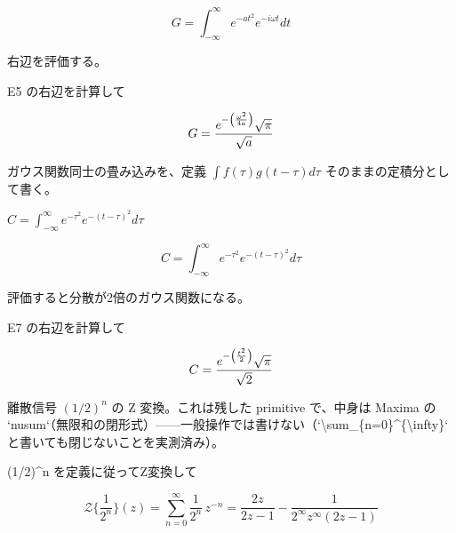 \documentclass[dvipdfmx,a4paper,11pt]{jsarticle}
\begin{document}
\begin{equation}
  G = \int_{-\infty}^{\infty} e^{-a t^2} e^{-i \omega t} dt
  \label{eq:E5}
\end{equation}

右辺を評価する。

E5 の右辺を計算して

\begin{equation}
  G = {{e^ {- \left(\frac{\omega^2}{4 a}\right) } \sqrt{\pi}}\over{\sqrt{a}}}
  \label{eq:E6}
\end{equation}

ガウス関数同士の畳み込みを、定義 $\int f(\tau)g(t-\tau)d\tau$ そのままの定積分として書く。

$C = \int_{-\infty}^{\infty} e^{-\tau^2} e^{-(t-\tau)^2} d\tau$

\begin{equation}
  C = \int_{-\infty}^{\infty} e^{-\tau^2} e^{-(t-\tau)^2} d\tau
  \label{eq:E7}
\end{equation}

評価すると分散が2倍のガウス関数になる。

E7 の右辺を計算して

\begin{equation}
  C = {{e^ {- \left(\frac{t^2}{2}\right) } \sqrt{\pi}}\over{\sqrt{2}}}
  \label{eq:E8}
\end{equation}

離散信号 $(1/2)^n$ の Z 変換。これは残した primitive で、中身は Maxima の `nusum`（無限和の閉形式）——一般操作では書けない（`\textbackslash{}sum\_\{n=0\}\^{}\{\textbackslash{}infty\}` と書いても閉じないことを実測済み）。

(1/2)\^{}n を定義に従ってZ変換して

\begin{equation}
  \mathcal{Z}\{\frac{1}{2^{n}}\}(z) = \sum_{n=0}^{\infty} \frac{1}{2^{n}}\, z^{-n} = \frac{2 z}{2 z-1}-\frac{1}{2^{\infty } z^{\infty } \left(2 z-1\right)}
  \label{eq:E9}
\end{equation}
\end{document}
